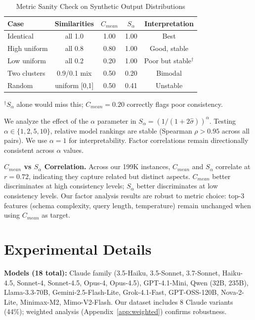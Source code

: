 \documentclass[sigconf,anonymous,review]{acmart}
\begin{document}
\begin{table}[h]
\centering
\caption{Metric Sanity Check on Synthetic Output Distributions}
\label{tab:metric_sanity}
\small
\begin{tabular}{@{}lcccc@{}}
\toprule
\textbf{Case} & \textbf{Similarities} & \textbf{$C_{mean}$} & \textbf{$S_\alpha$} & \textbf{Interpretation} \\
\midrule
Identical & all 1.0 & 1.00 & 1.00 & Best \\
High uniform & all 0.8 & 0.80 & 1.00 & Good, stable \\
Low uniform & all 0.2 & 0.20 & 1.00 & Poor but stable$^\dagger$ \\
Two clusters & 0.9/0.1 mix & 0.50 & 0.20 & Bimodal \\
Random & uniform [0,1] & 0.50 & 0.41 & Unstable \\
\bottomrule
\end{tabular}
\vspace{0.3em}

\raggedright\footnotesize $^\dagger$$S_\alpha$ alone would miss this; $C_{mean}=0.20$ correctly flags poor consistency.
\end{table}

We analyze the effect of the $\alpha$ parameter in $S_\alpha = (1/(1 + 2\hat{\sigma}))^\alpha$. Testing $\alpha \in \{1, 2, 5, 10\}$, relative model rankings are stable (Spearman $\rho > 0.95$ across all pairs). We use $\alpha=1$ for interpretability. Factor correlations remain directionally consistent across $\alpha$ values.

\textbf{$C_{mean}$ vs $S_\alpha$ Correlation.} Across our 199K instances, $C_{mean}$ and $S_\alpha$ correlate at $r=0.72$, indicating they capture related but distinct aspects. $C_{mean}$ better discriminates at high consistency levels; $S_\alpha$ better discriminates at low consistency levels. Our factor analysis results are robust to metric choice: top-3 features (schema complexity, query length, temperature) remain unchanged when using $C_{mean}$ as target.

\section{Experimental Details}
\label{app:experimental_details}

\textbf{Models (18 total):} Claude family (3.5-Haiku, 3.5-Sonnet, 3.7-Sonnet, Haiku-4.5, Sonnet-4, Sonnet-4.5, Opus-4, Opus-4.5), GPT-4.1-Mini, Qwen (32B, 235B), Llama-3.3-70B, Gemini-2.5-Flash-Lite, Grok-4.1-Fast, GPT-OSS-120B, Nova-2-Lite, Minimax-M2, Mimo-V2-Flash. Our dataset includes 8 Claude variants (44\%); weighted analysis (Appendix~\ref{app:weighted}) confirms robustness.
\end{document}
